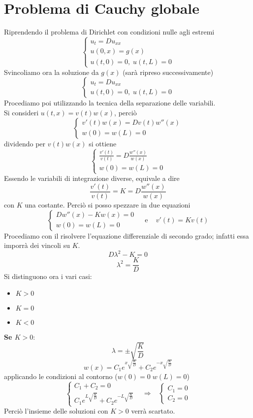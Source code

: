 \section{Problema di Cauchy globale}
Riprendendo il problema di Dirichlet con condizioni nulle agli estremi
\[
	\left\{
	\begin{array}{l}
		u_t=Du_{xx} \\
		u(0,x)=g(x) \\
		u(t,0)=0, \; u(t,L)=0
	\end{array}
	\right.
\]
Svincoliamo ora la soluzione da $g(x)$ (sar\`a ripreso successivamente)
\[
	\left\{
	\begin{array}{l}
		u_t=Du_{xx} \\
		u(t,0)=0, \; u(t,L)=0
	\end{array}
	\right.
\]
Procediamo poi utilizzando la tecnica della separazione delle variabili.\\
Si consideri $u(t,x)=v(t)w(x)$, perci\`o
\[
	\left\{
	\begin{array}{l}
		v'(t)w(x)=Dv(t)w''(x) \\
		w(0)=w(L)=0
	\end{array}
	\right.
\]
dividendo per $v(t)w(x)$ si ottiene
\[
	\left\{
	\begin{array}{l}
		\displaystyle{\frac{v'(t)}{v(t)}=D\frac{w''(x)}{w(x)} }\\
		w(0)=w(L)=0
	\end{array}
	\right.
\]
Essendo le variabili di integrazione diverse, equivale a dire
\[
	\frac{v'(t)}{v(t)}=K=D\frac{w''(x)}{w(x)}
\]
con $K$ una costante. Perci\`o si posso spezzare in due equazioni
\[
	\left\{
	\begin{array}{l}
		\displaystyle{D w''(x) - Kw(x) = 0 }\\
		w(0)=w(L)=0
	\end{array}
	\right.
	\;\;\;
	\text{ e }
	\;\;\;
	v'(t)=Kv(t)
\]
Procediamo con il risolvere l'equazione differenziale di secondo grado;
infatti essa imporr\`a dei vincoli su $K$.
\[
	D\lambda^2-K=0
\]
\[
	\lambda^2=\frac{K}{D}
\]
Si distinguono ora i vari casi:
\begin{itemize}
	\item $K>0$
	\item $K=0$
	\item $K<0$
\end{itemize}

{\bf Se $K>0$}:
\[
	\lambda=\pm \sqrt{\frac{K}{D}}
\]
\[
	w(x)= C_1e^{x\sqrt{\frac{K}{D}}} + C_2e^{-x\sqrt{\frac{K}{D}}}
\]
applicando le condizioni al contorno ($w(0)=0 \; w(L)=0$)
\[
	\left\{
	\begin{array}{l}
		C_1+C_2=0 \\
		\displaystyle{C_1e^{L\sqrt{\frac{K}{D}}}
			+ C_2e^{-L\sqrt{\frac{K}{D}}}}
	\end{array}
	\right.
	\;\;\;
	\Rightarrow
	\;\;\;
	\left\{
	\begin{array}{l}
		C_1=0\\
		C_2=0
	\end{array}
	\right.
\]
Perci\`o l'insieme delle soluzioni con $K>0$ verr\`a scartato.

